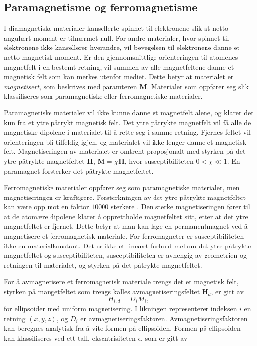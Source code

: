 \documentclass[%
 reprint,
nofootinbib,
aps,
]{revtex4-1}
\begin{document}
\subsection{Paramagnetisme og ferromagnetisme}
I diamagnetiske materialer kansellerte spinnet til elektronene slik at netto angulært moment er tilnærmet null. For andre materialer, hvor spinnet til elektronene ikke kansellerer hverandre, vil bevegelsen til elektronene danne et netto magnetisk moment. Er den gjennomsnittlige orienteringen til atomenes magnetfelt i en bestemt retning, vil summen av alle magnetfeltene danne et magnetisk felt som kan merkes utenfor mediet. Dette betyr at materialet er \textit{magnetisert}, som beskrives med paramteren $\bm{M}$. Materialer som oppfører seg slik klassifiseres som paramagnetiske eller ferromagnetiske materialer.\par
Paramagnetiske materialer vil ikke kunne danne et magnetfelt alene, og klarer det kun fra et ytre påtrykt magnetisk felt. Det ytre påtrykte magnetfelt vil få alle de magnetiske dipolene i materialet til å rette seg i samme retning. Fjernes feltet vil orienteringen bli tilfeldig igjen, og materialet vil ikke lenger danne et magnetisk felt. Magnetiseringen av materialet er omtrent proposjonalt med styrken på det ytre påtrykte magnetfeltet $\bm{H}$, $\bm{M} = \chi\bm{H}$, hvor susceptibiliteten $0<\chi\ll1$. En paramagnet forsterker det påtrykte magnetfeltet.
\par
Ferromagnetiske materialer oppfører seg som paramagnetiske materialer, men magnetiseringen er kraftigere. Forsterkningen av det ytre påtrykte magnetfeltet kan være opp mot en faktor $10 000$ sterkere \cite{oppgave}. Den sterke magnetiseringen fører til at de atomære dipolene klarer å opprettholde magnetfeltet sitt, etter at det ytre magnetfeltet er fjernet. Dette betyr at man kan lage en permanentmagnet ved å magnetisere et ferromagnetisk materiale. For ferromagneter er susceptibiliteten ikke en materialkonstant. Det er ikke et lineært forhold mellom det ytre påtrykte magnetfeltet og susceptibiliteten, susceptibiliteten er avhengig av geometrien og retningen til materialet, og styrken på det påtrykte magnetfeltet.
\par
For å avmagnetisere et ferromagnetisk materiale trengs det et magnetisk felt, styrken på mangetfeltet som trengs kalles avmagnetiseringsfeltet $\bm{H}_d$, er gitt av
\begin{equation}
  H_{i, d} = D_iM_i, \label{calc_avmag}
\end{equation}
for ellipsoider med uniform magnetisering. I likningen representerer indeksen $i$ en retning $(x, y, z)$, og $D_i$ er avmagnetiseringsfaktoren. Avmagnetiseringsfaktoren kan beregnes analytisk fra å vite formen på ellipsoiden. Formen på ellipsoiden kan klassifiseres ved ett tall, eksentrisiteten $\epsilon$, som er gitt av
\end{document}
